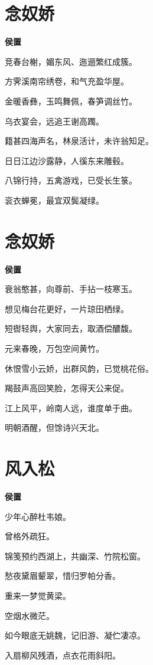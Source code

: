\documentclass[12pt,a4paper]{ctexbook}
\begin{document}
\section{念奴娇}
\textbf{侯置}\par\vspace{0.5em}
竞春台榭，媚东风、迤逦繁红成簇。\par
方霁溪南帘绣卷，和气充盈华屋。\par
金暖香彝，玉鸣舞佩，春笋调丝竹。\par
乌衣宴会，远追王谢高躅。\par
籍甚四海声名，林泉活计，未许翁知足。\par
日日江边沙露静，人徯东来雕毂。\par
八锦行持，五禽游戏，已受长生箓。\par
衮衣蝉冕，最宜双鬓凝绿。\par

\section{念奴娇}
\textbf{侯置}\par\vspace{0.5em}
衰翁憨甚，向尊前、手拈一枝寒玉。\par
想见梅台花更好，一片琼田栖绿。\par
短辔轻舆，大家同去，取酒偿醲馥。\par
元来春晚，万包空间黄竹。\par
休恨雪小云娇，出群风韵，已觉桃花俗。\par
羯鼓声高回笑脸，怎得天公来促。\par
江上风平，岭南人远，谁度单于曲。\par
明朝酒醒，但馀诗兴天北。\par

\section{风入松}
\textbf{侯置}\par\vspace{0.5em}
少年心醉杜韦娘。\par
曾格外疏狂。\par
锦笺预约西湖上，共幽深、竹院松窗。\par
愁夜黛眉颦翠，惜归罗帕分香。\par
重来一梦觉黄梁。\par
空烟水微茫。\par
如今眼底无姚魏，记旧游、凝伫凄凉。\par
入扇柳风残酒，点衣花雨斜阳。\par
\end{document}

